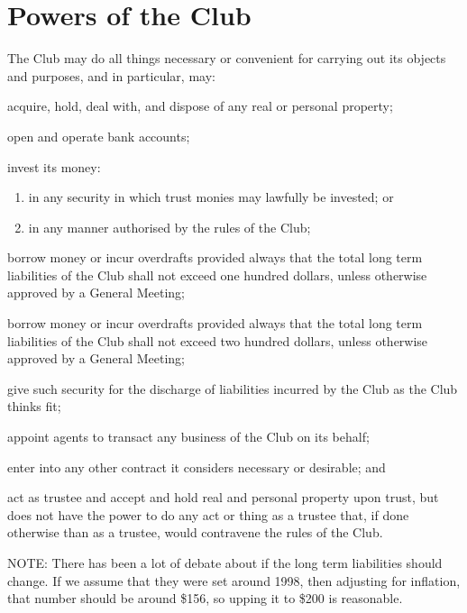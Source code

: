 \documentclass[11pt]{article} %
\begin{document}
\section{Powers of the Club}
The Club may do all things necessary or convenient for carrying out its objects and purposes, and in particular, may:
\begin{enumerate}
	\item acquire, hold, deal with, and dispose of any real or personal property;
	\item open and operate bank accounts;
	\item invest its money:
	\begin{enumerate}[1.]
			\item in any security in which trust monies may lawfully be invested; or
			\item in any manner authorised by the rules of the Club;
		\end{enumerate}
	{\color{red} \item borrow money or incur overdrafts provided always that the total long term liabilities of the Club shall not exceed one hundred dollars, unless otherwise approved by a General Meeting;}
	{\color{ForestGreen} \item borrow money or incur overdrafts provided always that the total long term liabilities of the Club shall not exceed two hundred dollars, unless otherwise approved by a General Meeting;}
	\item give such security for the discharge of liabilities incurred by the Club as the Club thinks fit;
	\item appoint agents to transact any business of the Club on its behalf;
	\item enter into any other contract it considers necessary or desirable; and
	\item act as trustee and accept and hold real and personal property upon trust, but does not have the power to do any act or thing as a trustee that, if done otherwise than as a trustee, would contravene the rules of the Club.
\end{enumerate}

{\color{Cyan}NOTE:
There has been a lot of debate about if the long term liabilities should change. If we assume that they were set around 1998, then adjusting for inflation, that number should be around \$156, so upping it to \$200 is reasonable.
}
\end{document}
